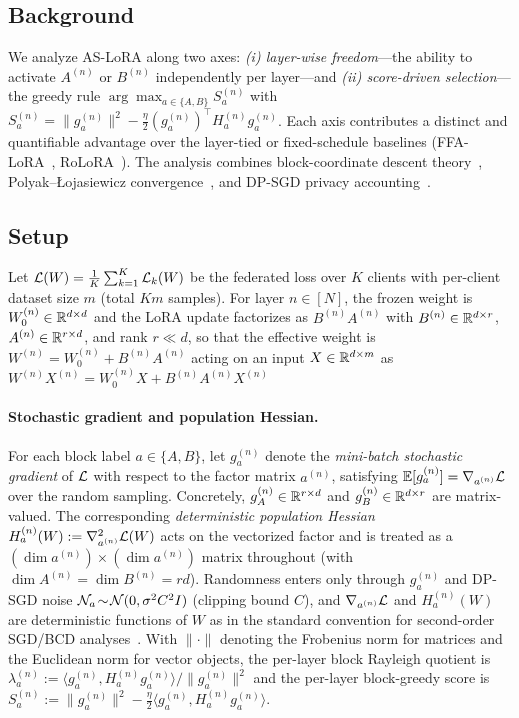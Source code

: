 \subsection{Background}
We analyze AS-LoRA along two axes: \emph{(i) layer-wise freedom}---the ability to activate $A^{(n)}$ or $B^{(n)}$ independently per layer---and \emph{(ii) score-driven selection}---the greedy rule $\arg\max_{a\in\{A,B\}} S_a^{(n)}$ with $S_a^{(n)}=\|g_a^{(n)}\|^2-\tfrac{\eta}{2}(g_a^{(n)})^\top H_a^{(n)} g_a^{(n)}$. Each axis contributes a distinct and quantifiable advantage over the layer-tied or fixed-schedule baselines (FFA-LoRA~\citep{sun2024improving}, RoLoRA~\citep{chen2025robust}). The analysis combines block-coordinate descent theory~\cite{nesterov2012bcd}, Polyak--{\L}ojasiewicz convergence~\citep{karimi2016pl}, and DP-SGD privacy accounting~\citep{abadi2016deep,mironov2017renyi,wang2019sgm}.



\subsection{Setup}

Let $\mathcal{L}(W)=\tfrac{1}{K}\sum_{k=1}^K\mathcal{L}_k(W)$ be the federated loss over $K$ clients with per-client dataset size $m$ (total $Km$ samples). For layer $n\in[N]$, the frozen weight is $W_0^{(n)}\in\mathbb{R}^{d\times d}$ and the LoRA update factorizes as $B^{(n)}A^{(n)}$ with $B^{(n)}\in\mathbb{R}^{d\times r}$, $A^{(n)}\in\mathbb{R}^{r\times d}$, and rank $r\!\ll\!d$, so that the effective weight is $W^{(n)}=W_0^{(n)}+B^{(n)}A^{(n)}$ acting on an input $X\in\mathbb{R}^{d\times m}$ as $W^{(n)}X^{(n)}=W_0^{(n)}X+B^{(n)}A^{(n)}X^{(n)}$

\paragraph{Stochastic gradient and population Hessian.}
For each block label $a\in\{A,B\}$, let $g_a^{(n)}$ denote the \emph{mini-batch stochastic gradient} of $\mathcal{L}$ with respect to the factor matrix $a^{(n)}$, satisfying $\mathbb{E}[g_a^{(n)}]=\nabla_{a^{(n)}}\mathcal{L}$ over the random sampling. Concretely, $g_A^{(n)}\in\mathbb{R}^{r\times d}$ and $g_B^{(n)}\in\mathbb{R}^{d\times r}$ are matrix-valued. The corresponding \emph{deterministic population Hessian} $H_a^{(n)}(W):=\nabla^2_{a^{(n)}}\mathcal{L}(W)$ acts on the vectorized factor and is treated as a $(\dim a^{(n)})\!\times\!(\dim a^{(n)})$ matrix throughout (with $\dim A^{(n)}=\dim B^{(n)}=rd$). Randomness enters only through $g_a^{(n)}$ and DP-SGD noise $\mathcal{N}_a\!\sim\!\mathcal{N}(0,\sigma^2 C^2 I)$ (clipping bound $C$), and $\nabla_{a^{(n)}}\mathcal{L}$ and $H_a^{(n)}(W)$ are deterministic functions of $W$ as in the standard convention for second-order SGD/BCD analyses~\cite{karimi2016pl,nesterov2012bcd}. With $\|\cdot\|$ denoting the Frobenius norm for matrices and the Euclidean norm for vector objects, the per-layer block Rayleigh quotient is $\lambda_a^{(n)}:=\langle g_a^{(n)}, H_a^{(n)} g_a^{(n)}\rangle/\|g_a^{(n)}\|^2$ and the per-layer block-greedy score is $S_a^{(n)}:=\|g_a^{(n)}\|^2-\tfrac{\eta}{2}\langle g_a^{(n)}, H_a^{(n)} g_a^{(n)}\rangle$. 

